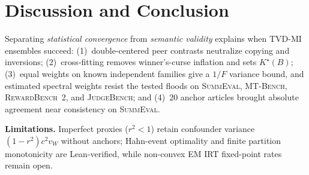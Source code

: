 \section{Discussion and Conclusion}
\label{sec:conclusion}

Separating \emph{statistical convergence} from \emph{semantic validity} explains when TVD-MI ensembles succeed: (1)~double-centered peer contrasts neutralize copying and inversions; (2)~cross-fitting removes winner's-curse inflation and sets $K^\star(B)$; (3)~equal weights on known independent families give a $1/F$ variance bound, and estimated spectral weights resist the tested floods on \textsc{SummEval}, \textsc{MT-Bench}, \textsc{RewardBench~2}, and \textsc{JudgeBench}; and (4)~20 anchor articles brought absolute agreement near consistency on \textsc{SummEval}.

\textbf{Limitations.} Imperfect proxies ($r^2 < 1$) retain confounder variance $(1-r^2)c^2v_W$ without anchors; Hahn-event optimality and finite partition monotonicity are Lean-verified, while non-convex EM IRT fixed-point rates remain open.
